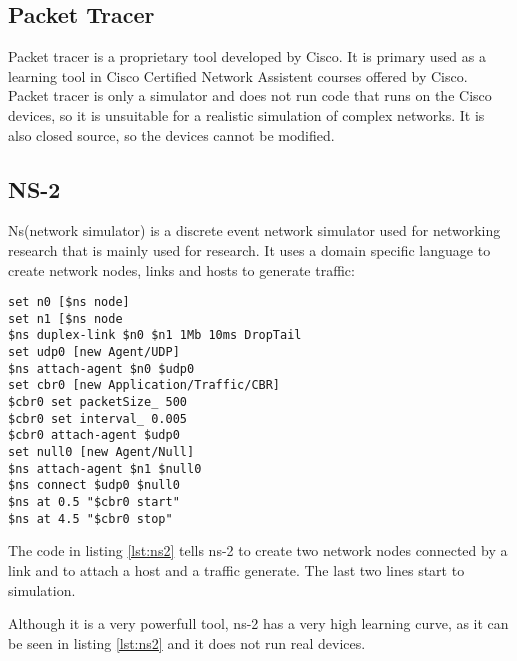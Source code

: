 \subsection{Packet Tracer}

Packet tracer is a proprietary tool developed by Cisco. It is primary used as a learning tool
in Cisco Certified Network Assistent courses offered by Cisco.
Packet tracer is only a simulator and does not run code that runs on the Cisco devices, so
it is unsuitable for a realistic simulation of complex networks. It is also closed source, so
the devices cannot be modified.


\subsection{NS-2}
Ns(network simulator) is a discrete event network simulator used for networking research that is
mainly used for research. It uses a domain specific language to create network nodes, links and
hosts to generate traffic:
\lstset{language=zsh, caption=NS-2 topology, label=lst:ns2}
\begin{lstlisting}
set n0 [$ns node]
set n1 [$ns node
$ns duplex-link $n0 $n1 1Mb 10ms DropTail
set udp0 [new Agent/UDP]
$ns attach-agent $n0 $udp0
set cbr0 [new Application/Traffic/CBR]
$cbr0 set packetSize_ 500
$cbr0 set interval_ 0.005
$cbr0 attach-agent $udp0
set null0 [new Agent/Null] 
$ns attach-agent $n1 $null0
$ns connect $udp0 $null0
$ns at 0.5 "$cbr0 start"
$ns at 4.5 "$cbr0 stop"
\end{lstlisting}
The code in listing \ref{lst:ns2} tells ns-2 to create two network nodes connected by a link
and to attach a host and a traffic generate. The last two lines start to simulation.

Although it is a very powerfull tool, ns-2 has a very high learning curve, as it can be seen
in listing \ref{lst:ns2} and it does not run real devices.

